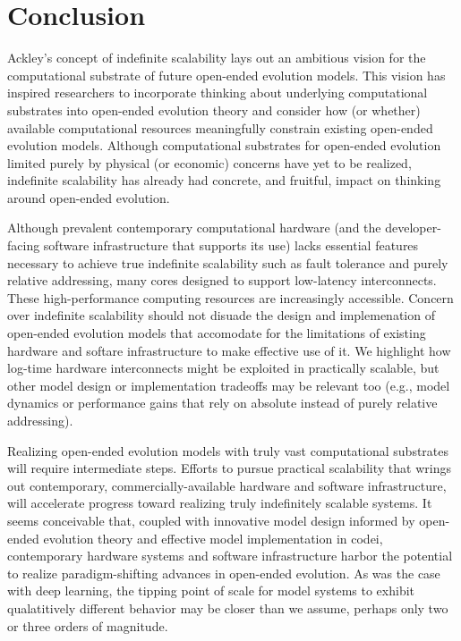 \section{Conclusion}

Ackley's concept of indefinite scalability lays out an ambitious vision for the computational substrate of future open-ended evolution models.
This vision has inspired researchers to incorporate thinking about underlying computational substrates into open-ended evolution theory and consider how (or whether) available computational resources meaningfully constrain existing open-ended evolution models.
Although computational substrates for open-ended evolution limited purely by physical (or economic) concerns have yet to be realized, indefinite scalability has already had concrete, and fruitful, impact on thinking around open-ended evolution.

Although prevalent contemporary computational hardware (and the developer-facing software infrastructure that supports its use) lacks essential features necessary to achieve true indefinite scalability such as fault tolerance and purely relative addressing, many cores designed to support low-latency interconnects.
These high-performance computing resources are increasingly accessible.
Concern over indefinite scalability should not disuade the design and implemenation of open-ended evolution models that accomodate for the limitations of existing hardware and softare infrastructure to make effective use of it.
We highlight how log-time hardware interconnects might be exploited in practically scalable, but other model design or implementation tradeoffs may be relevant too (e.g., model dynamics or performance gains that rely on absolute instead of purely relative addressing).

Realizing open-ended evolution models with truly vast computational substrates will require intermediate steps.
Efforts to pursue practical scalability that wrings out contemporary, commercially-available hardware and software infrastructure, will accelerate progress toward realizing truly indefinitely scalable systems.
It seems conceivable that, coupled with innovative model design informed by open-ended evolution theory and effective model implementation in codei, contemporary hardware systems and software infrastructure harbor the potential to realize paradigm-shifting advances in open-ended evolution.
As was the case with deep learning, the tipping point of scale for model systems to exhibit qualatitively different behavior may be closer than we assume, perhaps only two or three orders of magnitude.

